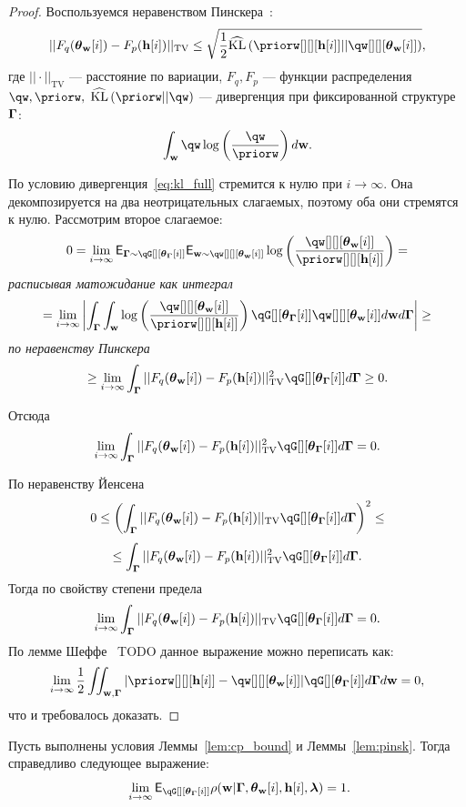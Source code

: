 \begin{proof}
Воспользуемся неравенством Пинскера~\cite{pinsker}:
\[
    ||F_q(\tetaw[i])-F_p(\h[i])||_\text{TV}\leq\sqrt{\frac{1}{2}\widehat{\text{KL}}\left(\priorw[][][{\h[i]}]||\qw[][][{\tetaw[i]}]\right)},
\]
где $||\cdot||_\text{TV}$ --- расстояние по вариации, $F_q, F_p$ --- функции распределения  $\qw,\priorw,$  $\widehat{\text{KL}}\left(\priorw||\qw\right)$ --- дивергенция при фиксированной структуре $\boldsymbol{\Gamma}$:
\[
   \int_{\w} \qw \log \left(\frac{\qw}{\priorw}\right) d\w.
\]

По условию дивергенция~\eqref{eq:kl_full} стремится к нулю при $i \to \infty$. Она декомпозируется на два  неотрицательных слагаемых, поэтому оба они стремятся к нулю.
Рассмотрим второе слагаемое:
\[
  0 =   \lim_{i \to \infty} \E_{\G \sim \qG[][{\tetaG[i]}]} \E_{\w \sim \qw[][][{\tetaw[i]}]} \log \left(\frac{\qw[][][{\tetaw[i]}]}{\priorw[][][{\h[i]}]}\right) = 
\]
\textit{расписывая матожидание как интеграл}
\[
 =  \lim_{i \to \infty} \left|\int_{\G} \int_{\w} \log \left(\frac{\qw[][][{\tetaw[i]}]}{\priorw[][][{\h[i]}]}\right)\qG[][{\tetaG[i]}]\qw[][][{\tetaw[i]}] d\w d\G \right| \geq  
\]
\textit{по неравенству Пинскера}
\[
\geq \lim_{i \to \infty}  \int_{\G} ||F_q({\tetaw[i]})-F_p({\h[i]})||^2_\text{TV}\qG[][{\tetaG[i]}] d\G \geq 0.  
\]

Отсюда
\[
\lim_{i \to \infty}  \int_{\G} ||F_q({\tetaw[i]})-F_p({\h[i]})||^2_\text{TV}\qG[][{\tetaG[i]}] d\G = 0.
\]

По неравенству Йенсена 
\[
0 \leq  \left(\int_{\G} ||F_q({\tetaw[i]})-F_p({\h[i]})||_\text{TV}\qG[][{\tetaG[i]}] d\G\right)^2 \leq
\]
\[
 \leq   \int_{\G} ||F_q({\tetaw[i]})-F_p({\h[i]})||^2_\text{TV}\qG[][{\tetaG[i]}] d\G.
\]
Тогда по свойству степени предела $$\lim_{i \to \infty} \int_{\G}||F_q({\tetaw[i]})-F_p({\h[i]})||_\text{TV} \qG[][{\tetaG[i]}] d\G = 0.$$
По лемме Шеффе~\cite{scheffe} TODO данное выражение можно переписать как:
\begin{equation}
\label{eq:sheffe}
    \lim_{i \to \infty}   \frac{1}{2}\iint_{\w,\G} |\priorw[][][{\h[i]}] - \qw[][][{\tetaw[i]}]| \qG[][{\tetaG[i]}] d\G d\w = 0,
\end{equation}
что и требовалось доказать.
\end{proof}




\begin{theorem}
Пусть выполнены условия Леммы~\ref{lem:cp_bound} и  Леммы~\ref{lem:pinsk}.
Тогда справедливо следующее выражение:
\[
   \lim_{i \to \infty} \E_{\qG[][{\tetaG[i]}]} {\rho}(\w|\G, {\tetaw[i]}, {\h[i]}, \lam) = 1.
\]

\end{theorem}

